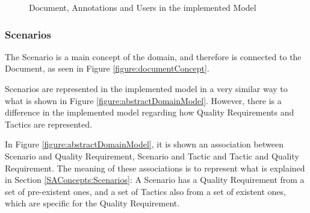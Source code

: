 \documentclass{llncs}
\begin{document}
\begin{figure}
\centering
\renewcommand {\umltextcolor}{black}
\renewcommand {\umlfillcolor}{none}
\renewcommand {\umldrawcolor}{black}

\caption{Document, Annotations and Users in the implemented Model}
\label{figure:modelDocUserAnnot}
\end{figure} 
 
\subsubsection{Scenarios}
\label{subsection:modelScenarios}
The Scenario is a main concept of the domain, and therefore is connected to the Document, as seen in Figure \ref{figure:documentConcept}. 

Scenarios are represented in the implemented model in a very similar way to what is shown in Figure \ref{figure:abstractDomainModel}. However, there is a difference in the implemented model regarding how Quality Requirements and Tactics are represented.

In Figure \ref{figure:abstractDomainModel}, it is shown an association between Scenario and Quality Requirement, Scenario and Tactic and Tactic and Quality Requirement. The meaning of these associations is to represent what is explained in Section \ref{SAConcepts:Scenarios}: A Scenario has a Quality Requirement from a set of pre-existent ones, and a set of Tactics also from a set of existent ones, which are specific for the Quality Requirement.
\end{document}
